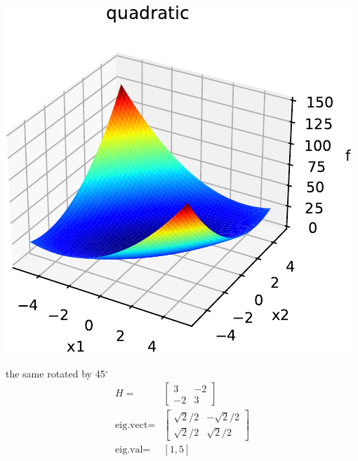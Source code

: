 \documentclass[12pt]{beamer}
\begin{document}
\begin{frame}[allowframebreaks]
\begin{minipage}{0.5\textwidth}
\includegraphics[width=\textwidth]{quad_rot45_cond5_H_3_m2_m2_3-crop.pdf}
\end{minipage}
\begin{minipage}{0.4\textwidth}
the same rotated by 45$^\circ$
\begin{align*}
H =& \begin{bmatrix} 3 & -2 \\ -2 & 3\end{bmatrix}  \\
\text{eig.vect} =& \begin{bmatrix} \sqrt{2}/2 & -\sqrt{2}/2 \\  \sqrt{2}/2 & \sqrt{2}/2 \end{bmatrix}\\
\text{eig.val} = & [1, 5]
\end{align*}
\end{minipage}
\newpage
\begin{minipage}{0.5\textwidth}

\end{minipage}
\end{frame}
\end{document}
